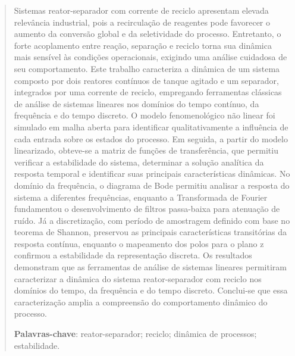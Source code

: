 \begin{abstract}
  Sistemas reator-separador com corrente de reciclo apresentam elevada relevância industrial, pois a recirculação de reagentes pode favorecer o aumento da conversão global e da seletividade do processo.
  Entretanto, o forte acoplamento entre reação, separação e reciclo torna sua dinâmica mais sensível às condições operacionais, exigindo uma análise cuidadosa de seu comportamento.
  Este trabalho caracteriza a dinâmica de um sistema composto por dois reatores contínuos de tanque agitado e um separador, integrados por uma corrente de reciclo, empregando ferramentas clássicas de análise de sistemas lineares nos domínios do tempo contínuo, da frequência e do tempo discreto.
  O modelo fenomenológico não linear foi simulado em malha aberta para identificar qualitativamente a influência de cada entrada sobre os estados do processo.
  Em seguida, a partir do modelo linearizado, obteve-se a matriz de funções de transferência, que permitiu verificar a estabilidade do sistema, determinar a solução analítica da resposta temporal e identificar suas principais características dinâmicas.
  No domínio da frequência, o diagrama de Bode permitiu analisar a resposta do sistema a diferentes frequências, enquanto a Transformada de Fourier fundamentou o desenvolvimento de filtros passa-baixa para atenuação de ruído.
  Já a discretização, com período de amostragem definido com base no teorema de Shannon, preservou as principais características transitórias da resposta contínua, enquanto o mapeamento dos polos para o plano z confirmou a estabilidade da representação discreta.
  Os resultados demonstram que as ferramentas de análise de sistemas lineares permitiram caracterizar a dinâmica do sistema reator-separador com reciclo nos domínios do tempo, da frequência e do tempo discreto.
  Conclui-se que essa caracterização amplia a compreensão do comportamento dinâmico do processo.

  \noindent
  \textbf{Palavras-chave}: reator-separador; reciclo; dinâmica de processos; estabilidade.
\end{abstract}
